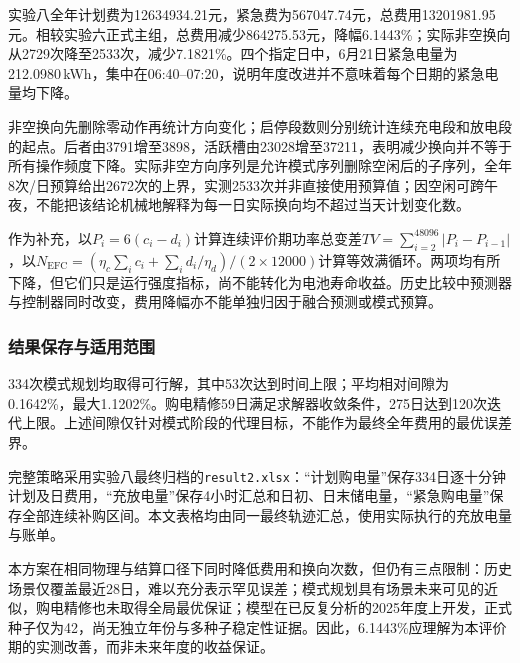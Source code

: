 实验八全年计划费为12634934.21元，紧急费为567047.74元，总费用13201981.95元。相较实验六正式主组，总费用减少864275.53元，降幅6.1443\%；实际非空换向从2729次降至2533次，减少7.1821\%。四个指定日中，6月21日紧急电量为212.0980\,kWh，集中在06:40--07:20，说明年度改进并不意味着每个日期的紧急电量均下降。

非空换向先删除零动作再统计方向变化；启停段数则分别统计连续充电段和放电段的起点。后者由3791增至3898，活跃槽由23028增至37211，表明减少换向并不等于所有操作频度下降。实际非空方向序列是允许模式序列删除空闲后的子序列，全年8次/日预算给出2672次的上界，实测2533次并非直接使用预算值；因空闲可跨午夜，不能把该结论机械地解释为每一日实际换向均不超过当天计划变化数。

作为补充，以$P_i=6(c_i-d_i)$计算连续评价期功率总变差$TV=\sum_{i=2}^{48096}|P_i-P_{i-1}|$，以$N_{\mathrm{EFC}}=(\eta_c\sum_i c_i+\sum_i d_i/\eta_d)/(2\times12000)$计算等效满循环。两项均有所下降，但它们只是运行强度指标，尚不能转化为电池寿命收益。历史比较中预测器与控制器同时改变，费用降幅亦不能单独归因于融合预测或模式预算。

\subsubsection{结果保存与适用范围}

334次模式规划均取得可行解，其中53次达到时间上限；平均相对间隙为0.1642\%，最大1.1202\%。购电精修59日满足求解器收敛条件，275日达到120次迭代上限。上述间隙仅针对模式阶段的代理目标，不能作为最终全年费用的最优误差界。

完整策略采用实验八最终归档的\texttt{result2.xlsx}：“计划购电量”保存334日逐十分钟计划及日费用，“充放电量”保存4小时汇总和日初、日末储电量，“紧急购电量”保存全部连续补购区间。本文表格均由同一最终轨迹汇总，使用实际执行的充放电量与账单。

本方案在相同物理与结算口径下同时降低费用和换向次数，但仍有三点限制：历史场景仅覆盖最近28日，难以充分表示罕见误差；模式规划具有场景未来可见的近似，购电精修也未取得全局最优保证；模型在已反复分析的2025年度上开发，正式种子仅为42，尚无独立年份与多种子稳定性证据。因此，6.1443\%应理解为本评价期的实测改善，而非未来年度的收益保证。
\clearpage
